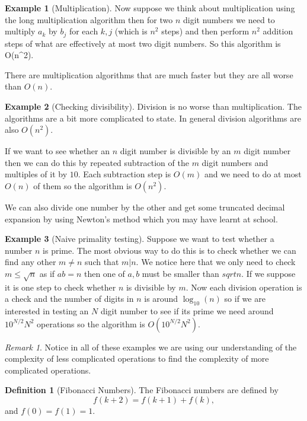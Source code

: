 \documentclass[
]{book}
\theoremstyle{definition}
\newtheorem{definition}{Definition}[chapter]
\theoremstyle{definition}
\newtheorem{example}{Example}[chapter]
\theoremstyle{definition}
\theoremstyle{definition}
\theoremstyle{remark}
\newtheorem*{remark}{Remark}
\begin{document}
\begin{example}[Multiplication]
Now suppose we think about multiplication using the long multiplication algorithm then for two \(n\) digit numbers we need to multiply \(a_k\) by \(b_j\) for each \(k, j\) (which is \(n^2\) steps) and then perform \(n^2\) addition steps of what are effectively at most two digit numbers. So this algorithm is O(n\^{}2).

There are multiplication algorithms that are much faster but they are all worse than \(O(n)\).
\end{example}

\begin{example}[Checking divisibility]
Division is no worse than multiplication. The algorithms are a bit more complicated to state. In general division algorithms are also \(O(n^2)\).

If we want to see whether an \(n\) digit number is divisible by an \(m\) digit number then we can do this by repeated subtraction of the \(m\) digit numbers and multiples of it by \(10\). Each subtraction step is \(O(m)\) and we need to do at most \(O(n)\) of them so the algorithm is \(O(n^2)\).

We can also divide one number by the other and get some truncated decimal expansion by using Newton's method which you may have learnt at school.
\end{example}

\begin{example}[Naive primality testing]
Suppose we want to test whether a number \(n\) is prime. The most obvious way to do this is to check whether we can find any other \(m \neq n\) such that \(m|n\). We notice here that we only need to check \(m \leq \sqrt{n}\) as if \(ab=n\) then one of \(a, b\) must be smaller than \(sqrt{n}\). If we suppose it is one step to check whether \(n\) is divisible by \(m\). Now each division operation is a check and the number of digits in \(n\) is around \(\log_{10}(n)\) so if we are interested in testing an \(N\) digit number to see if its prime we need around \(10^{N/2}N^2\) operations so the algorithm is \(O(10^{N/2} N^2)\).
\end{example}

\begin{remark}
Notice in all of these examples we are using our understanding of the complexity of less complicated operations to find the complexity of more complicated operations.
\end{remark}

\begin{definition}[Fibonacci Numbers]
The Fibonacci numbers are defined by
\[ f(k+2) = f(k+1 ) + f(k),  \] and \(f(0)=f(1)=1\).
\end{definition}
\end{document}
